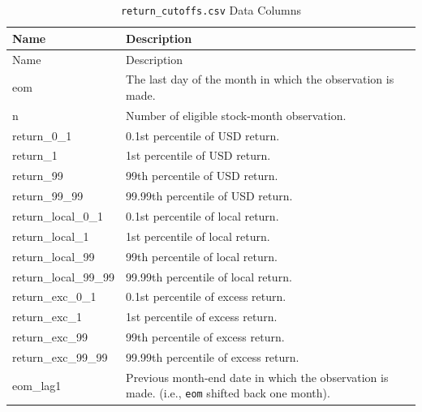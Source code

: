 \documentclass[12pt,title,fleqn]{article}
\begin{document}
{\scriptsize
	\begin{longtable}{@{\extracolsep{\fill}}|l|m{14.2cm}|@{}}
	\caption{\texttt{return\_cutoffs.csv} Data Columns \label{return-cutoffs}}\\
	
	\hline
	Name & Description \\
	\hline
	\endfirsthead
	
	\hline
	Name & Description \\
	\hline
	\endhead
	
	\hline
	\endfoot
	
	
	\hline\hline
	\endlastfoot
    
    eom\rule{0pt}{10pt} & The last day of the month in which the observation is made. \\[1ex]

    n & Number of eligible stock-month observation. \\[1ex]

    return\_0\_1 & 0.1st percentile of USD return. \\[1ex]

    return\_1 & 1st percentile of USD return. \\[1ex]
    
    return\_99 & 99th percentile of USD return. \\[1ex]

    return\_99\_99 & 99.99th percentile of USD return. \\[1ex]

    return\_local\_0\_1 & 0.1st percentile of local return. \\[1ex]

    return\_local\_1 & 1st percentile of local return. \\[1ex]
    
    return\_local\_99 & 99th percentile of local return. \\[1ex]

    return\_local\_99\_99 & 99.99th percentile of local return. \\[1ex]

    return\_exc\_0\_1 & 0.1st percentile of excess return. \\[1ex]

    return\_exc\_1 & 1st percentile of excess return. \\[1ex]
    
    return\_exc\_99 & 99th percentile of excess return. \\[1ex]

    return\_exc\_99\_99 & 99.99th percentile of excess return. \\[1ex]

    eom\_lag1 & Previous month-end date in which the observation is made. (i.e., \texttt{eom} shifted back one month). \\[1ex]

\end{longtable}}
\end{document}
